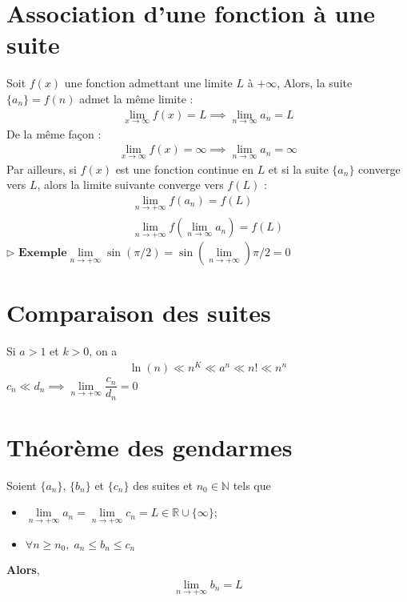 \documentclass{report}
\begin{document}
\begin{multicols*}{3}
    \section{Association d'une fonction à une suite}
        Soit $f\left(x\right)$ une fonction admettant une limite $L$ à 
        $\text{+}\infty$, Alors, la suite 
        $\{a_n\} = f\left(n\right)$ admet la même limite : 
        \begin{align*}
          \lim\limits_{x\to\infty  }f(x) = L \implies \lim\limits_{n\to\infty  }a_n = L
        \end{align*}
        De la même façon :
        \begin{align*}
          \lim\limits_{x\to\infty  }f(x) = \infty \implies \lim\limits_{n\to\infty  }a_n = \infty
        \end{align*}
        Par ailleurs, si $f\left(x\right)$ est une fonction continue en 
        $L$ et si la suite $\{a_n\}$
        converge vers $L$, alors la limite suivante converge vers $f\left(L\right)$ :
        \begin{align*}
                    \lim\limits_{n\to+\infty  }f(a_n)  = f(L) \\ 
                    \lim\limits_{n\to+\infty  }f(\lim\limits_{n \to \infty} a_n)  
                    = f(L)  
        \end{align*}
        $\rhd$ $ \textbf{Exemple}  \lim\limits_{n \to+\infty }\sin(\pi/2)  = 
        \sin(\lim\limits_{n \to+\infty })  \pi/2  = 0$




    \section{Comparaison des suites}
        Si $a > 1$ et $k > 0$, on a 
        \begin{align*}
            \ln(n) \ll n^K \ll a^n \ll n! \ll n^n
        \end{align*}
        $c_n \ll d_n \implies 
        \lim\limits_{n\to+\infty }\dfrac{c_n}{d_n} = 0$ 


    \section{Théorème des gendarmes}{}
        Soient $\{a_n\}$, $\{b_n\}$ et $\{c_n\}$ des suites et $n_0 \in \mathbb{N}$ tels 
        que
        \begin{itemize}
            \item $\lim\limits_{n\to+\infty }a_n  = 
                \lim\limits_{n\to+\infty }c_n  = L 
                \in \mathbb{R} \cup \{\infty \}$; 
            \item $\forall n \geq n_0, \; a_n \leq b_n \leq c_n$ 
        \end{itemize}
        \textbf{Alors},
        \begin{align*}
            \lim\limits_{n\to+\infty}b_n  = L                   
        \end{align*}




\end{multicols*}
\end{document}
